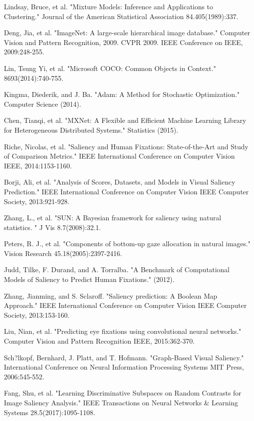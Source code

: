 \documentclass[letterpaper, 10 pt, conference]{ieeeconf}  %
\begin{document}
\begin{thebibliography}{00}
 Lindsay, Bruce, et al. "Mixture Models: Inference and Applications to Clustering." Journal of the American Statistical Association 84.405(1989):337.

 Deng, Jia, et al. "ImageNet: A large-scale hierarchical image database." Computer Vision and Pattern Recognition, 2009. CVPR 2009. IEEE Conference on IEEE, 2009:248-255.

 Lin, Tsung Yi, et al. "Microsoft COCO: Common Objects in Context." 8693(2014):740-755.

 Kingma, Diederik, and J. Ba. "Adam: A Method for Stochastic Optimization." Computer Science (2014).

 Chen, Tianqi, et al. "MXNet: A Flexible and Efficient Machine Learning Library for Heterogeneous Distributed Systems." Statistics (2015).

 Riche, Nicolas, et al. "Saliency and Human Fixations: State-of-the-Art and Study of Comparison Metrics." IEEE International Conference on Computer Vision IEEE, 2014:1153-1160.

 Borji, Ali, et al. "Analysis of Scores, Datasets, and Models in Visual Saliency Prediction." IEEE International Conference on Computer Vision IEEE Computer Society, 2013:921-928.

 Zhang, L., et al. "SUN: A Bayesian framework for saliency using natural statistics. " J Vis 8.7(2008):32.1.

 Peters, R. J., et al. "Components of bottom-up gaze allocation in natural images." Vision Research 45.18(2005):2397-2416.

 Judd, Tilke, F. Durand, and A. Torralba. "A Benchmark of Computational Models of Saliency to Predict Human Fixations." (2012).

 Zhang, Jianming, and S. Sclaroff. "Saliency prediction: A Boolean Map Approach." IEEE International Conference on Computer Vision IEEE Computer Society, 2013:153-160.

 Liu, Nian, et al. "Predicting eye fixations using convolutional neural networks." Computer Vision and Pattern Recognition IEEE, 2015:362-370.

 Sch?lkopf, Bernhard, J. Platt, and T. Hofmann. "Graph-Based Visual Saliency." International Conference on Neural Information Processing Systems MIT Press, 2006:545-552.

 Fang, Shu, et al. "Learning Discriminative Subspaces on Random Contrasts for Image Saliency Analysis." IEEE Transactions on Neural Networks \& Learning Systems 28.5(2017):1095-1108.


\end{thebibliography}
\end{document}
